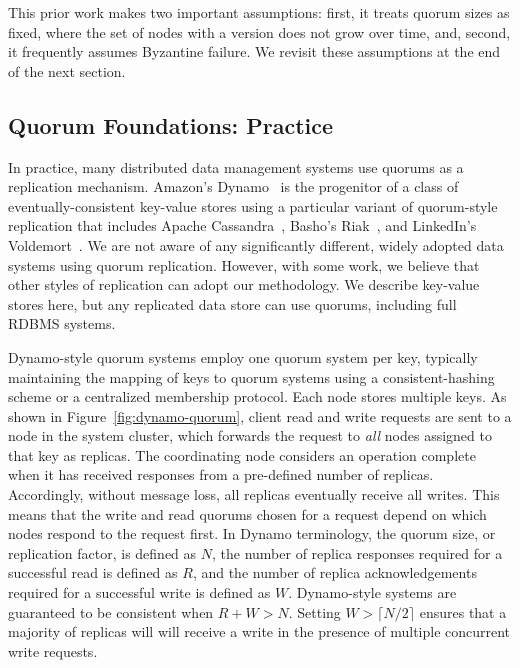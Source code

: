 \documentclass{vldb}
\newcommand{\subsectionskip}{-0em}
\begin{document}
This prior work makes two important assumptions: first, it treats
quorum sizes as fixed, where the set of nodes with a version does not
grow over time, and, second, it frequently assumes Byzantine failure.
We revisit these assumptions at the end of the next section.

\vspace{\subsectionskip}\subsection{Quorum Foundations: Practice}
\label{sec:practice}

In practice, many distributed data management systems use quorums as a
replication mechanism. Amazon's Dynamo~\cite{dynamo} is the progenitor
of a class of eventually-consistent key-value stores using a
particular variant of quorum-style replication that includes Apache
Cassandra~\cite{cassandra, cassandra-sigmod}, Basho's
Riak~\cite{riak}, and LinkedIn's Voldemort~\cite{voldemort,
  voldemortpub}.  We are not aware of any significantly different,
widely adopted data systems using quorum replication.  However, with
some work, we believe that other styles of replication can adopt our
methodology.  We describe key-value stores here, but any replicated
data store can use quorums, including full RDBMS systems.

Dynamo-style quorum systems employ one quorum system per key,
typically maintaining the mapping of keys to quorum systems using a
consistent-hashing scheme or a centralized membership protocol. Each
node stores multiple keys.  As shown in
Figure~\ref{fig:dynamo-quorum}, client read and write requests are
sent to a node in the system cluster, which forwards the request to
\textit{all} nodes assigned to that key as replicas.  The coordinating
node considers an operation complete when it has received responses
from a pre-defined number of replicas.  Accordingly, without message
loss, all replicas eventually receive all writes.  This means that the
write and read quorums chosen for a request depend on which nodes
respond to the request first.  In Dynamo terminology, the quorum size,
or replication factor, is defined as $N$, the number of replica
responses required for a successful read is defined as $R$, and the
number of replica acknowledgements required for a successful write is
defined as $W$. Dynamo-style systems are guaranteed to be consistent
when $R+W > N$.  Setting $W>\lceil N/2 \rceil$ ensures that a majority
of replicas will will receive a write in the presence of multiple
concurrent write requests.
\end{document}
